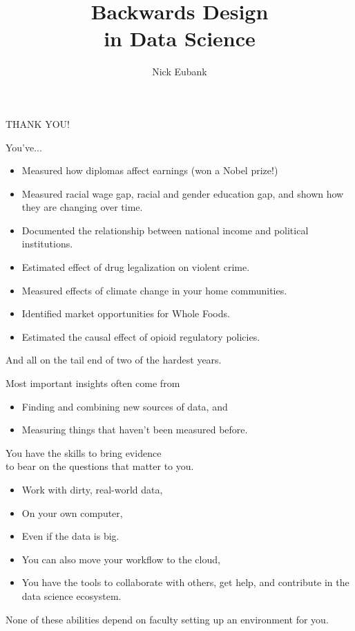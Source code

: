 \documentclass[11pt]{beamer}
\title{Backwards Design \\ in Data Science}
\author{\small Nick Eubank}
\date{\vspace*{.3in} \date}
\begin{document}
\begin{frame}[c]
\centering
\pause THANK YOU!
\end{frame}

\begin{frame}[c]{}
You've...
  \begin{itemize}
    \item Measured how diplomas affect earnings (won a Nobel prize!)
    \pause \item Measured racial wage gap, racial and gender education gap, and shown how they are changing over time.
    \pause \item Documented the relationship between national income and political institutions.
    \pause \item Estimated effect of drug legalization on violent crime.
    \pause \item Measured effects of climate change in your home communities.
    \pause \item Identified market opportunities for Whole Foods.
    \pause \item Estimated the causal effect of opioid regulatory policies.
  \end{itemize}
  \pause 
And all on the tail end of two of the hardest years.
\end{frame}

\begin{frame}[c]{}
Most important insights often come from
\begin{itemize}
  \pause \item Finding and combining new sources of data, and
  \pause \item Measuring things that haven't been measured before.
\end{itemize}
\end{frame}

\begin{frame}[c]{}
\begin{center}
  You have the skills to bring evidence \\
  to bear \alert{on the questions that matter to you.}

\end{center}

\begin{itemize}
  \pause \item Work with dirty, real-world data,
  \pause \item On your own computer,
  \pause \item Even if the data is big.
  \pause \item You can also move your workflow to the cloud,
  \pause \item You have the tools to collaborate with others, get help, and contribute in the data science ecosystem.
\end{itemize}
\vspace*{0.2cm}
\pause \alert{None} of these abilities depend on faculty setting up an environment for you.\\
\end{frame}
\end{document}
